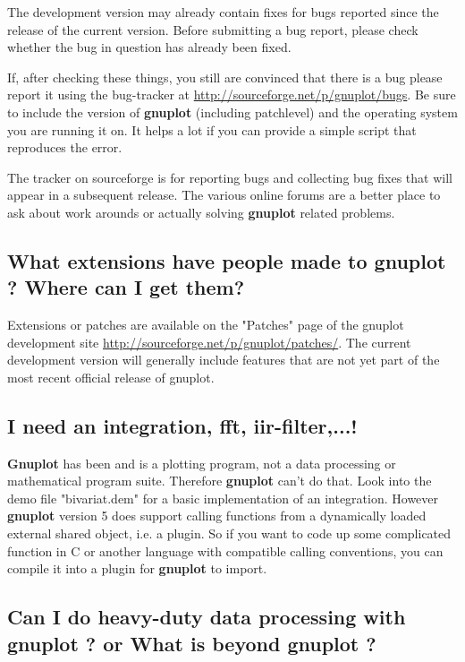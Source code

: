 \documentclass[a4paper,11pt]{article}
\def\http#1{{\small\href{http://#1}{\url{http://#1}}}}
\newcommand{\http}[1]%
            {\htmladdnormallink{\latex{\url{http://#1}}%
                    \html{\textit{http://#1}}}%
                {http://#1}%
            }
\newcommand{\gnuplot}{\textbf{gnuplot }}
\newcommand{\Gnuplot}{\textbf{Gnuplot }}
\begin{document}
The development version may already contain fixes for bugs reported
since the release of the current version.
Before submitting a bug report, please check whether the bug in question
has already been fixed.

If, after checking these things, you still are convinced that there is a
bug please report it using the bug-tracker at
\http{sourceforge.net/p/gnuplot/bugs}.
Be sure to include the version of \gnuplot (including patchlevel) and 
the operating system you are running it on.
It helps a lot if you can provide a simple script that reproduces the error.

The tracker on sourceforge is for reporting bugs and collecting bug fixes
that will appear in a subsequent release.
The various online forums are a better place to ask about
work arounds or actually solving \gnuplot related problems.


\subsection{What extensions have people made to \gnuplot? Where can I get
them?}

Extensions or patches are available on the "Patches" page of the
gnuplot development site
\http{sourceforge.net/p/gnuplot/patches/}.
The current development version will generally include features that are
not yet part of the most recent official release of gnuplot.

\subsection{I need an integration, fft, iir-filter,...!}

\Gnuplot{} has been and is a plotting program, not a data
processing or mathematical program suite. Therefore \gnuplot
can't do that. Look into the demo file "bivariat.dem" for a basic
implementation of an integration.  However \gnuplot version 5 does
support calling functions from a dynamically loaded external shared
object, i.e. a plugin.  So if you want to code up some complicated
function in C or another language with compatible calling conventions,
you can compile it into a plugin for \gnuplot to import.

\subsection{Can I do heavy-duty data processing with \gnuplot? or
What is beyond \gnuplot?}
\end{document}
